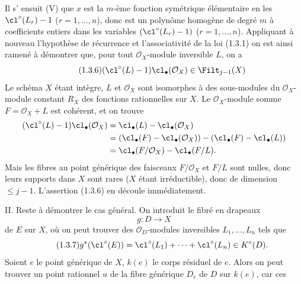 Il s'%
ensuit (V) que $x$ est la $m$-ème fonction symétrique élémentaire en les $\cl^\circ(L_r)-1$ ($r=1,\ldots,n$), donc est un polynôme homogène de degré $m$ à coefficients entiers dans les variables $(\cl^\circ(L_r)-1)$ ($r=1,\ldots,n$). Appliquant à nouveau l'hypothèse de récurrence et l'associativité de la loi (1.3.1) on est ainsi ramené à démontrer que, pour tout $\mathcal O_X$-module inversible $L$, on a
\begin{equation}\tag{1.3.6}
(\cl^\circ(L)-1)\cl_\bullet(\mathcal O_X)\in\Filt_{j-1}(X)
\end{equation}
Le schéma $X$ étant intègre, $L$ et $\mathcal O_X$ sont isomorphes à des sous-modules du $\mathcal O_X$-module constant $R_X$ des fonctions rationnelles sur $X$. Le $\mathcal O_X$-module somme $F=\mathcal O_X+L$ est cohérent, et on trouve
\begin{align*}
(\cl^\circ(L)-1)\cl_\bullet(\mathcal O_X)
&=\cl_\bullet(L)-\cl_\bullet(\mathcal O_X)\\
&=(\cl_\bullet(F)-\cl_\bullet(\mathcal O_X))-(\cl_\bullet(F)-\cl_\bullet(L))\\
&=\cl_\bullet(F/\mathcal O_X)-\cl_\bullet(F/L).
\end{align*}
Mais les fibres au point générique des faisceaux $F/\mathcal O_X$ et $F/L$ sont nulles, donc leurs supports dans $X$ sont rares ($X$ étant irréductible), donc de dimension $\leq j-1$. L'assertion (1.3.6) en découle immédiatement.

II. Reste à démontrer le cas général. On introduit le fibré en drapeaux
\[
g:D\longrightarrow X
\]
de $E$ sur $X$, où on peut trouver des $\mathcal O_D$-modules inversibles $L_1,\ldots,L_n$ tels que
\begin{equation}\tag{1.3.7}
g^*(\cl^\circ(E))=\cl^\circ(L_1)+\cdots+\cl^\circ(L_n)\in K^\circ(D).
\end{equation}
Soient $e$ le point générique de $X$, $k(e)$ le corps résiduel de $e$. Alors on peut trouver un point rationnel $u$ de la fibre générique $D_e$ de $D$ sur $k(e)$, car ces
